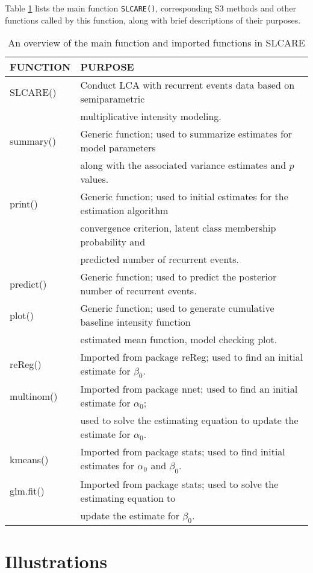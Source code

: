 Table \ref{tab:SLCAREfunctions-static} lists the main function \texttt{SLCARE()}, corresponding S3 methods and other functions called by this function, along with brief descriptions of their purposes.

\begin{table}
\centering
\caption{\label{tab:SLCAREfunctions-static}An overview of the main function and imported functions in SLCARE}
\centering
\begin{tabular}[t]{ll}
\toprule
FUNCTION & PURPOSE\\
\midrule
SLCARE() & Conduct LCA with recurrent events data based on semiparametric\\
 & multiplicative intensity modeling.\\
summary() & Generic function; used to summarize estimates for model parameters\\
 & along with the associated variance estimates and $p$ values.\\
print() & Generic function; used to initial estimates for the estimation algorithm\\
\addlinespace
 & convergence criterion, latent class membership probability and\\
 & predicted number of recurrent events.\\
predict() & Generic function; used to predict the posterior number of recurrent events.\\
plot() & Generic function; used to generate cumulative baseline intensity function\\
 & estimated mean function, model checking plot.\\
\addlinespace
reReg() & Imported from  package reReg; used to find an initial estimate for $\beta_0$.\\
multinom() & Imported from  package nnet; used to find an initial estimate for $\alpha_0$;\\
 & used to solve the estimating equation to update the estimate for $\alpha_0$.\\
kmeans() & Imported from package stats; used to find initial estimates for $\alpha_0$ and $\beta_0$.\\
glm.fit() & Imported from package stats; used to solve the estimating equation to\\
\addlinespace
 & update the estimate for $\beta_0$.\\
\bottomrule
\end{tabular}
\end{table}

\hypertarget{illustrations}{%
\section{Illustrations}\label{illustrations}}

